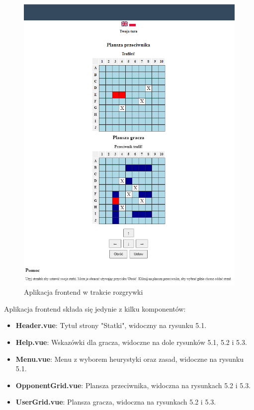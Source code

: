 \begin{figure}[!h]
    \label{fig:frontend--in-game}
    \centering \includegraphics[width=1\linewidth]{img/frontend-in-game.PNG}
    \caption{Aplikacja frontend w trakcie rozgrywki}
\end{figure}

Aplikacja frontend składa się jedynie z kilku komponentów:
\begin{itemize}
    \item \textbf{Header.vue}: Tytuł strony "Statki", widoczny na rysunku 5.1.
    \item \textbf{Help.vue}: Wskazówki dla gracza, widoczne na dole rysunków 5.1, 5.2 i 5.3.
    \item \textbf{Menu.vue}: Menu z wyborem heurystyki oraz zasad, widoczne na rysunku 5.1.
    \item \textbf{OpponentGrid.vue}: Plansza przeciwnika, widoczna na rysunkach 5.2 i 5.3.
    \item \textbf{UserGrid.vue}: Plansza gracza, widoczna na rysunkach 5.2 i 5.3.
\end{itemize}

